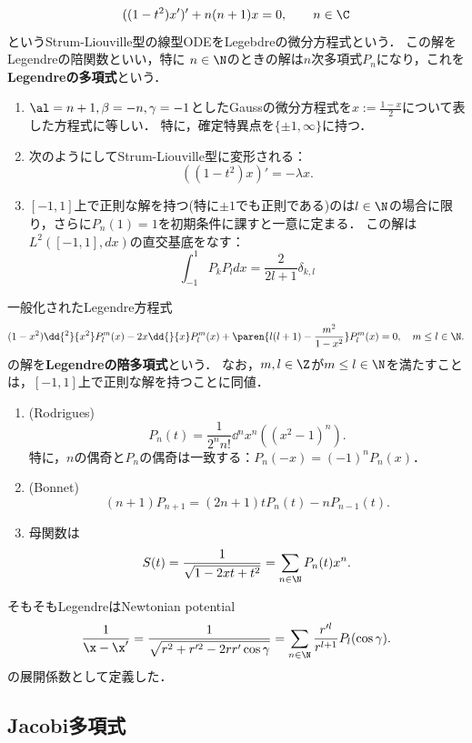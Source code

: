 \documentclass[uplatex,dvipdfmx]{jsreport}
\begin{document}
\begin{problem}
    \[((1-t^2)x')'+n(n+1)x=0,\qquad n\in\C\]
    というStrum-Liouville型の線型ODEをLegebdreの微分方程式という．
    この解をLegendreの陪関数といい，特に
    $n\in\N$のときの解は$n$次多項式$P_n$になり，これを\textbf{Legendreの多項式}という．
    \begin{enumerate}
        \item $\al=n+1,\beta=-n,\gamma=-1$としたGaussの微分方程式を$x:=\frac{1-x}{2}$について表した方程式に等しい．
        特に，確定特異点を$\{\pm1,\infty\}$に持つ．
        \item 次のようにしてStrum-Liouville型に変形される：
        \[((1-t^2)x)'=-\lambda x.\]
        \item $[-1,1]$上で正則な解を持つ(特に$\pm1$でも正則である)のは$l\in\N$の場合に限り，さらに$P_n(1)=1$を初期条件に課すと一意に定まる．
        この解は$L^2([-1,1],dx)$の直交基底をなす：
        \[\int^1_{-1}P_kP_ldx=\frac{2}{2l+1}\delta_{k,l}\]
    \end{enumerate}
\end{problem}
\begin{remark}
    一般化されたLegendre方程式
    \[(1-x^2)\dd{^2}{x^2}P^m_l(x)-2x\dd{}{x}P^m_l(x)+\paren{l(l+1)-\frac{m^2}{1-x^2}}P^m_l(x)=0,\quad m\le l\in\N.\]
    の解を\textbf{Legendreの陪多項式}という．
    なお，$m,l\in\Z$が$m\le l\in\N$を満たすことは，$[-1,1]$上で正則な解を持つことに同値．
\end{remark}

\begin{proposition}\mbox{}
    \begin{enumerate}
        \item (Rodrigues)
        \[P_n(t)=\frac{1}{2^nn!}\dd{^n}{x^n}((x^2-1)^n).\]
        特に，$n$の偶奇と$P_n$の偶奇は一致する：$P_n(-x)=(-1)^nP_n(x)$．
        \item (Bonnet)
        \[(n+1)P_{n+1}=(2n+1)tP_n(t)-nP_{n-1}(t).\]
        \item 母関数は
        \[S(t)=\frac{1}{\sqrt{1-2xt+t^2}}=\sum_{n\in\N}P_n(t)x^n.\]
    \end{enumerate}
\end{proposition}
\begin{remark}
    そもそもLegendreはNewtonian potential
    \[\frac{1}{\x-\x'}=\frac{1}{\sqrt{r^2+r'^2-2rr'\cos\gamma}}=\sum_{n\in\N}\frac{r'^l}{r^{l+1}}P_l(\cos\gamma).\]
    の展開係数として定義した．
\end{remark}

\subsection{Jacobi多項式}
\end{document}
